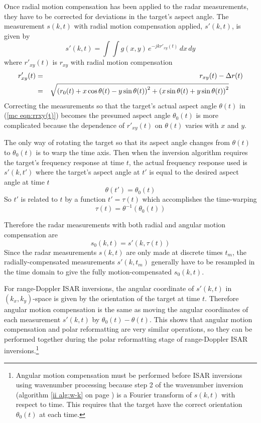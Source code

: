 Once radial motion compensation has been applied to the radar measurements,
they have to be corrected for deviations in the target's aspect angle.
The measurement $s(k,t)$ with radial motion compensation applied, $s'(k,t)$, 
is given by
\begin{equation}
s'(k,t)=\int\!\!\int g(x,y)\,e^{-jkr'_{xy}(t)}\,dx\,dy
\end{equation}
where $r'_{xy}(t)$ is $r_{xy}$ with radial motion compensation
\begin{eqnarray}
r'_{xy}(t)
&=&r_{xy}(t)-\Delta r(t)			{\nonumber}\\
&=&\sqrt{\left(r_0(t)+x\cos\theta(t)-y\sin\theta(t)\right)^2
+\left(x\sin\theta(t)+y\sin\theta(t)\right)^2}\qquad
\label{mc eqn:rrxy(t)}
\end{eqnarray}
Correcting the measurements so that the target's actual aspect angle 
$\theta(t)$ in (\ref{mc eqn:rrxy(t)}) becomes the presumed aspect angle 
$\theta_0(t)$ is more complicated because the dependence of $r'_{xy}(t)$ 
on $\theta(t)$ varies with $x$ and $y$.
  
The only way of rotating the target so that its aspect angle changes from 
$\theta(t)$ to $\theta_0(t)$ is to warp the time axis.  Then when the
inversion algorithm requires the target's frequency response at time $t$,
the actual frequency response used is $s'(k,t')$ where the target's aspect
angle at $t'$ is equal to the desired aspect angle at time $t$
\begin{equation}
\theta(t')=\theta_0(t)
\end{equation}
So $t'$ is related to $t$ by a function $t'=\tau(t)$ which accomplishes the
time-warping
\begin{equation}
\tau(t)=\theta^{-1}\left(\theta_0(t)\right)
\end{equation}

Therefore the radar measurements with both radial and angular motion
compensation are
\begin{equation}
s_0(k,t)=s'(k,\tau(t))
\end{equation}
Since the radar measurements $s(k,t)$ are only made at discrete times $t_m$,
the radially-compensated measurements $s'(k,t_m)$ generally have to be 
resampled in the time domain to give the fully motion-compensated $s_0(k,t)$.

For range-Doppler ISAR inversions, the angular coordinate of $s'(k,t)$ in
$(k_x,k_y)$-space is given by the orientation of the target at time $t$.  
Therefore angular motion compensation is the same as moving the angular
coordinates of each measurement $s'(k,t)$ by $\theta_0(t)-\theta(t)$.
This shows that angular motion compensation and polar reformatting are very
similar operations, so they can be performed together during the polar
reformatting stage of range-Doppler ISAR inversions.\footnote{Angular motion
compensation must be performed before ISAR inversions using wavenumber
processing because step 2 of the wavenumber inversion (algorithm 
\protect\ref{ii alg:w-k} on page \protect\pageref{ii alg:w-k}) is a Fourier
transform of $s(k,t)$ with respect to time.  This requires that the target
have the correct orientation $\theta_0(t)$ at each time.}

